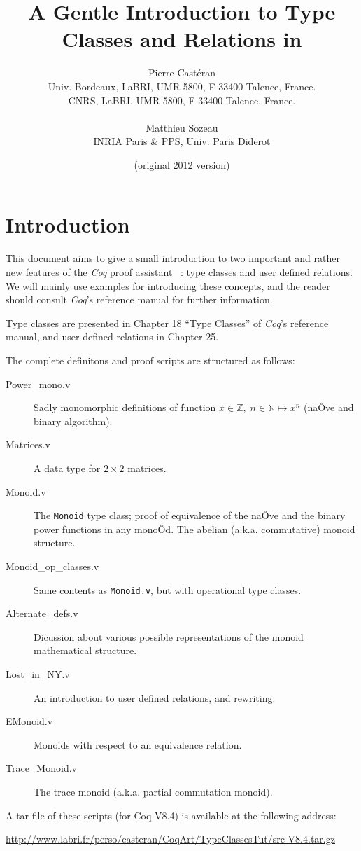 \documentclass[a4]{report}
\title{A Gentle Introduction to Type Classes and Relations in \coq{}}
\author{Pierre Castéran\\Univ. Bordeaux, LaBRI, UMR 5800, F-33400 Talence, France.\\
CNRS, LaBRI, UMR 5800, F-33400 Talence, France.\\
\\
Matthieu Sozeau\\INRIA Paris \& PPS, Univ. Paris Diderot}
\date{(original 2012 version)}
\newcommand{\coq}{\mbox{\emph{Coq}}}
\begin{document}
\maketitle

\chapter{Introduction}

This document aims to give a small introduction to two important and
rather new features of the {\coq} proof assistant~\citep{Coq, coqart} : type classes and user defined
relations. We will mainly use examples for introducing these concepts, and 
the reader should consult \coq's reference manual for further information.

Type classes are presented in Chapter 18 ``Type Classes''  of {\coq}'s reference manual, and user defined relations in Chapter 25.

The complete definitons and proof scripts are structured as follows:
\begin{description}
\item[Power\_mono.v] Sadly monomorphic definitions of function
   $x\in \mathbb{Z},\;n\in\mathbb{N}\mapsto x^n$ (naÔve and binary algorithm).
\item[Matrices.v] A data type for $2\times 2$ matrices.
\item[Monoid.v] The \texttt{Monoid} type class; proof of equivalence of
  the naÔve and the binary power functions in any monoÔd. The abelian
  (a.k.a. commutative) monoid structure.
\item[Monoid\_op\_classes.v]
  Same contents as \texttt{Monoid.v}, but with operational type classes.
\item[Alternate\_defs.v] Dicussion about various possible representations of
        the monoid mathematical structure.
\item[Lost\_in\_NY.v] An introduction to user defined relations, and rewriting.
\item[EMonoid.v]  Monoids with respect to an equivalence relation.
\item[Trace\_Monoid.v] The trace monoid (a.k.a. partial commutation monoid).
\end{description}

A tar file of these scripts (for Coq V8.4) is available 
at the following address:

\href{http://www.labri.fr/perso/casteran/CoqArt/TypeClassesTut/src-V8.4.tar.gz}{http://www.labri.fr/perso/casteran/CoqArt/TypeClassesTut/src-V8.4.tar.gz}
\end{document}
